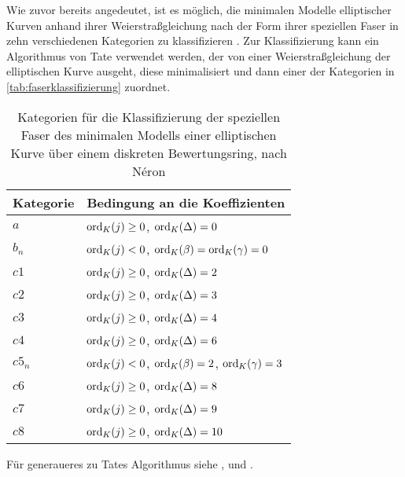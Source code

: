 \documentclass[german, bibliography=totoc]{scrreprt}
\begin{document}
Wie zuvor bereits angedeutet, ist es möglich, die minimalen Modelle
elliptischer Kurven anhand ihrer Weierstraßgleichung nach der Form
ihrer speziellen Faser in zehn verschiedenen Kategorien zu
klassifizieren \cite[vgl.][Theorem IV.8.2]{silverman2}.
Zur Klassifizierung kann ein Algorithmus von Tate verwendet werden,
der von einer Weierstraßgleichung der elliptischen Kurve ausgeht, diese
minimalisiert und dann einer der Kategorien in
\autoref{tab:faserklassifizierung} zuordnet.
\begin{table}[tbhp]
  \begin{center}
    \begin{tabular}{@{}ll@{}}
      \toprule
      Kategorie & Bedingung an die Koeffizienten\\
      \midrule[\heavyrulewidth]
      $a$& $\operatorname{ord}_{K}(j)\geq0$, $\operatorname{ord}_{K}(\Delta)=0$\\\midrule
      $b_n$& $\operatorname{ord}_{K}(j)<0$, $\operatorname{ord}_{K}(\beta)=\operatorname{ord}_{K}(\gamma)=0$\\\midrule
      $c1$& $\operatorname{ord}_{K}(j)\geq0$, $\operatorname{ord}_{K}(\Delta)=2$\\\midrule
      $c2$& $\operatorname{ord}_{K}(j)\geq0$, $\operatorname{ord}_{K}(\Delta)=3$\\\midrule
      $c3$& $\operatorname{ord}_{K}(j)\geq0$, $\operatorname{ord}_{K}(\Delta)=4$\\\midrule
      $c4$& $\operatorname{ord}_{K}(j)\geq0$, $\operatorname{ord}_{K}(\Delta)=6$\\\midrule
      $c5_n$& $\operatorname{ord}_{K}(j)<0$, $\operatorname{ord}_{K}(\beta)=2$, $\operatorname{ord}_{K}(\gamma)=3$\\\midrule
      $c6$& $\operatorname{ord}_{K}(j)\geq0$, $\operatorname{ord}_{K}(\Delta)=8$\\\midrule
      $c7$& $\operatorname{ord}_{K}(j)\geq0$, $\operatorname{ord}_{K}(\Delta)=9$\\\midrule
      $c8$& $\operatorname{ord}_{K}(j)\geq0$, $\operatorname{ord}_{K}(\Delta)=10$\\\bottomrule
    \end{tabular}
  \end{center}
  \caption{\label{tab:faserklassifizierung} Kategorien für die
    Klassifizierung der speziellen Faser des minimalen Modells einer
    elliptischen Kurve über einem diskreten Bewertungsring,
    nach Néron
  \cite[vgl.][Chapter 1.5]{neron}}
\end{table}
Für generaueres zu Tates Algorithmus siehe
\cite[Chapter IV.9]{silverman2},
\cite[Chapter 1.5]{neron} und \cite{tate}.

\end{document}

